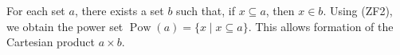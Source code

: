 For each set $a$, there exists a set $b$ such that, if $x \subseteq a$, then $x \in b$. Using (ZF2), we obtain the power set $\operatorname{Pow}(a) = \{x \mid x \subseteq a\}$. This allows formation of the Cartesian product $a \times b$.

